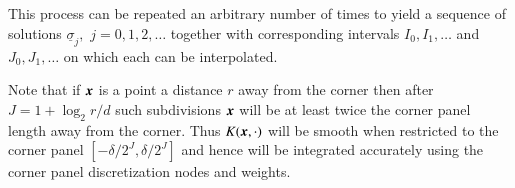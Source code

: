 This process can be repeated an arbitrary number of times to yield a sequence of solutions $\underline{\sigma}_j,$ $j=0,1,2,\dots$ together with corresponding intervals $I_0,I_1,\dots$ and $J_0,J_1,\dots$ on which each can be interpolated.

Note that if $\boldsymbol{x}$ is a point a distance $r$ away from the corner then after $J=1+\log_2 r/d$ such subdivisions $\boldsymbol{x}$ will be at least twice the corner panel length away from the corner. Thus $K(\boldsymbol{x},\cdot)$ will be smooth when restricted to the corner panel $[-\delta/2^{J},\delta/2^J]$ and hence will be integrated accurately using the corner panel discretization nodes and weights.
